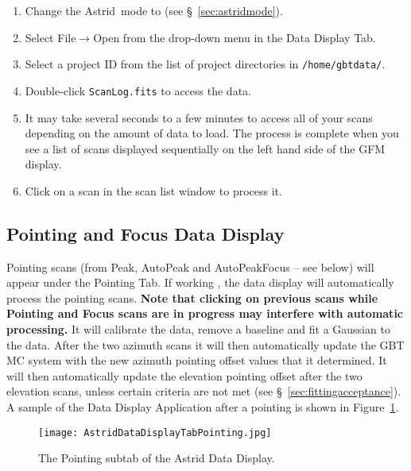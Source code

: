 \begin{enumerate}[label=\bfseries{Step \arabic*.},leftmargin=*,itemsep=0pt]
\item Change the \gls{Astrid}\ mode to  (see \S~\ref{sec:astridmode}).
\item Select {\btt File}$\rightarrow${\btt Open} from the drop-down menu in the Data Display Tab.
\item Select a project ID from the list of project directories in {\tt /home/gbtdata/}.
\item Double-click {\tt ScanLog.fits} to access the data.
\item It may take several seconds to a few minutes to access all of your scans depending
on the amount of data to load.  The process is complete when you see a list of scans displayed
sequentially on the left hand side of the \gls{GFM} display.
\item Click on a scan in the scan list window to process it.
\end{enumerate}

\subsection{Pointing and Focus Data Display}\label{sec:pointandfocus}
%
%

Pointing scans (from Peak, AutoPeak and AutoPeakFocus -- see below) will appear under
the Pointing Tab.  If working , the data display will automatically process
the pointing scans. {\bf Note that clicking on previous scans while Pointing and Focus
scans are in progress may interfere with automatic processing.} It will calibrate the
data, remove a \gls{baseline} and fit a Gaussian to the data.  After the two azimuth
scans it will then automatically update the \gls{GBT} \gls{MC} system with the new azimuth
pointing offset values that it determined. It will then automatically update the
elevation pointing offset after the two elevation scans, unless certain criteria are
not met (see \S~\ref{sec:fittingacceptance}). A sample of the Data Display Application
after a pointing is shown in Figure~\ref{fig:astridpointing}.

\begin{figure}[!h]
\begin{center}
\texttt{[image: AstridDataDisplayTabPointing.jpg]}
\caption[The Pointing subtab of the Astrid Data Display]
{The Pointing subtab of the \gls{Astrid} Data Display. 
\label{fig:astridpointing} }
\end{center}
\end{figure}

